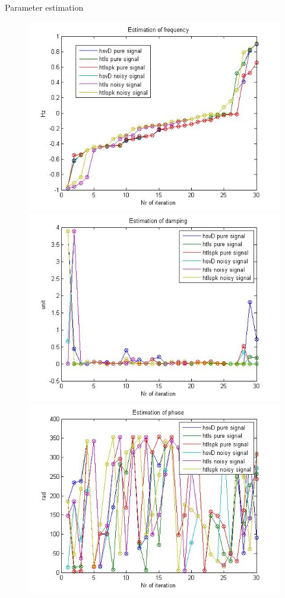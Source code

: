 \documentclass[t,12pt,english
\ifx\beamermode\undefined\else,\beamermode\fi
]{beamer}
\begin{document}
\begin{frame}{Parameter estimation}
\begin{figure}[!htbp]
\endminipage\hfill
{}%
\centering
\includegraphics[width=.8\textwidth]{13.jpg}
\endminipage\hfill
{}%
\centering
\includegraphics[width=.8\textwidth]{14.jpg}
\endminipage\hfill
{}%
\centering
\includegraphics[width=.8\textwidth]{15.jpg}
\endminipage\hfill
\end{figure}
    
\end{frame}
\end{document}
